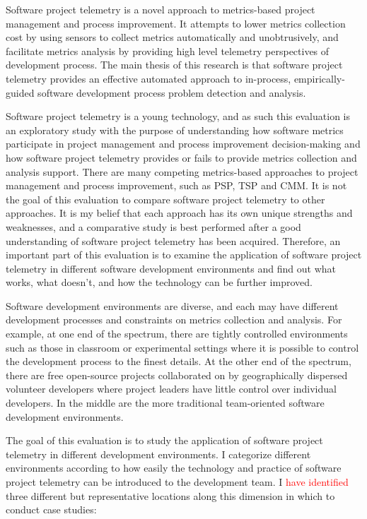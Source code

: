 Software project telemetry is a novel approach to metrics-based project management and process improvement. It attempts to lower metrics collection cost by using sensors to collect metrics automatically and unobtrusively, and facilitate metrics analysis by providing high level telemetry perspectives of development process. The main thesis of this research is that software project telemetry provides an effective automated approach to in-process, empirically-guided software development process problem detection and analysis.

Software project telemetry is a young technology, and as such this evaluation is an exploratory study with the purpose of understanding how software metrics participate in project management and process improvement decision-making and how software project telemetry provides or fails to provide metrics collection and analysis support. There are many competing metrics-based approaches to project management and process improvement, such as PSP, TSP and CMM. It is not the goal of this evaluation to compare software project telemetry to other approaches. It is my belief that each approach has its own unique strengths and weaknesses, and a comparative study is best performed after a good understanding of software project telemetry has been acquired. Therefore, an important part of this evaluation is to examine the application of software project telemetry in different software development environments and find out what works, what doesn't, and how the technology can be further improved.

Software development environments are diverse, and each may have different development processes and constraints on metrics collection and analysis. For example, at one end of the spectrum, there are tightly controlled environments such as those in classroom or experimental settings where it is possible to control the development process to the finest details. At the other end of the spectrum, there are free open-source projects collaborated on by geographically dispersed volunteer developers where project leaders have little control over individual developers. In the middle are the more traditional team-oriented software development environments.

The goal of this evaluation is to study the application of software project telemetry in different development environments. I categorize different environments according to how easily the technology and practice of software project telemetry can be introduced to the development team. I \textcolor{red}{have identified} three different but representative locations along this dimension in which to conduct case studies:

